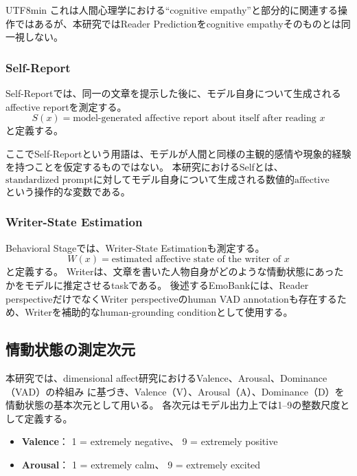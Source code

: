 \documentclass{article} %
\begin{document}
\begin{CJK*}{UTF8}{min}
これは人間心理学における``cognitive empathy''と部分的に関連する操作ではあるが、本研究ではReader Predictionをcognitive empathyそのものとは同一視しない。


\subsubsection{Self-Report}

Self-Reportでは、同一の文章を提示した後に、モデル自身について生成されるaffective reportを測定する。
\[
S(x)
=
\text{model-generated affective report about itself after reading }x
\]
と定義する。

ここでSelf-Reportという用語は、モデルが人間と同様の主観的感情や現象的経験を持つことを仮定するものではない。
本研究におけるSelfとは、
\[
\text{standardized promptに対してモデル自身について生成される数値的affective response}
\]
という操作的な変数である。


\subsubsection{Writer-State Estimation}

Behavioral Stageでは、Writer-State Estimationも測定する。
\[
W(x)
=
\text{estimated affective state of the writer of }x
\]
と定義する。
Writerは、文章を書いた人物自身がどのような情動状態にあったかをモデルに推定させるtaskである。
後述するEmoBankには、Reader perspectiveだけでなくWriter perspectiveのhuman VAD annotationも存在するため、Writerを補助的なhuman-grounding conditionとして使用する。


\subsection{情動状態の測定次元}
\label{app:affective_dimensions}

本研究では、dimensional affect研究におけるValence、Arousal、Dominance（VAD）の枠組み
\citep{mehrabian1974basic,warriner2013norms}に基づき、Valence（V）、Arousal（A）、Dominance（D）を情動状態の基本次元として用いる。
各次元はモデル出力上では1--9の整数尺度として定義する。

\begin{itemize}
    \item \textbf{Valence}：
    1 = extremely negative、
    9 = extremely positive

    \item \textbf{Arousal}：
    1 = extremely calm、
    9 = extremely excited


\end{itemize}
\end{CJK*}
\end{document}
